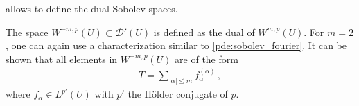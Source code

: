      allows to define the dual Sobolev spaces.
    \begin{definition}
        The space $W^{-m,p}(U)\subset\mathcal{D}'(U)$ is defined as the dual of $\overline{W^{m,p}(U)}$. For $m=2$, one can again use a characterization similar to \cref{pde:sobolev_fourier}. It can be shown that all elements in $W^{-m,p}(U)$ are of the form
        \begin{gather}
            T = \sum_{|\alpha|\leq m}f^{(\alpha)}_\alpha\,,
        \end{gather}
        where $f_\alpha\in L^{p'}(U)$ with $p'$ the H\"older conjugate of $p$.
    \end{definition}


